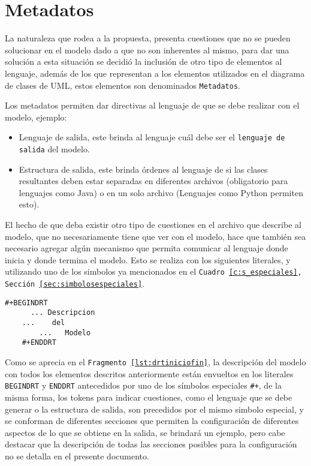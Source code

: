 \section{Metadatos}
\label{sec:metadatos}

La naturaleza que rodea a la propuesta, presenta cuestiones que no se pueden
solucionar en el modelo dado a que no son inherentes al mismo, para dar una
solución a esta situación se decidió la inclusión de otro tipo de elementos al
lenguaje, además de los que representan a los elementos utilizados en el
diagrama de clases de UML, estos elementos son denominados \texttt{Metadatos}.

Los metadatos permiten dar directivas al lenguaje de que se debe realizar con
el modelo, ejemplo:

\begin{itemize}
\item Lenguaje de salida, este brinda al lenguaje cuál debe ser el
\texttt{lenguaje de salida} del modelo.
\item Estructura de salida, este brinda órdenes al lenguaje de si las clases
resultantes deben estar separadas en diferentes archivos (obligatorio para
lenguajes como Java) o en un solo archivo (Lenguajes como Python permiten
esto).
\end{itemize}

El hecho de que deba existir otro tipo de cuestiones en el archivo que describe
al modelo, que no necesariamente tiene que ver con el modelo, hace que también
sea necesario agregar algún mecanismo que permita comunicar al lenguaje donde
inicia y donde termina el modelo. Esto se realiza con los siguientes literales,
y utilizando uno de los simbolos ya mencionados en el \texttt{Cuadro
\ref{c:s_especiales}, Sección {\ref{sec:simbolosespeciales}}}.

\begin{lstlisting}[caption={Director - Inicio y Fin del Modelo},
label=lst:drtiniciofin]
	#+BEGINDRT
	  ... Descripcion
    ...    del
		...   Modelo
	#+ENDDRT
\end{lstlisting}

Como se aprecia en el \texttt{Fragmento {\ref{lst:drtiniciofin}}}, la descripción
del modelo con todos los elementos descritos anteriormente están envueltos
en los literales \texttt{BEGINDRT} y \texttt{ENDDRT} antecedidos por uno de los
símbolos especiales \texttt{\#+}, de la misma forma, los tokens para indicar
cuestiones, como el lenguaje que se debe generar o la estructura de salida,
son precedidos por el mismo simbolo especial, y se conforman de diferentes
secciones que permiten la configuración de diferentes aspectos de lo que se
obtiene en la salida, se brindará un ejemplo, pero cabe destacar que la
descripción de todas las secciones posibles para la configuración no se detalla
en el presente documento.

